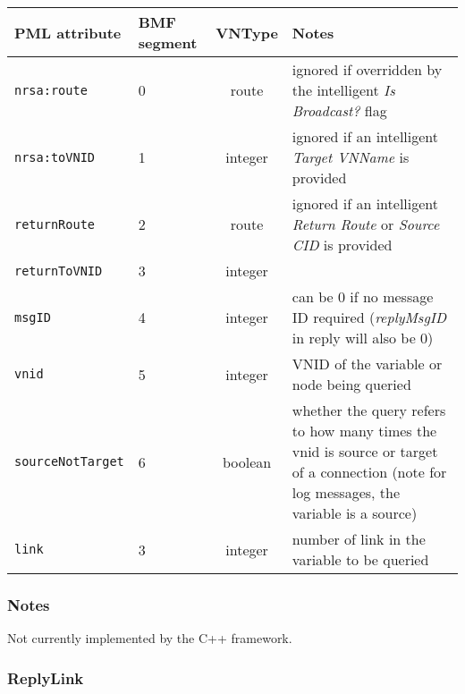 \documentclass[pdftex,a4paper]{article}
\newcommand{\XMLfont}[1]{{\tt \small #1}}
\begin{document}
\begin{table}[!h]
  \begin{center}
    \label{tab:QueryLink}
    \begin{tabular}{|l|p{13mm}|c|p{60mm}|}
      \hline

      \textbf{PML attribute} & \textbf{BMF segment} & \textbf{VNType}
      & \textbf{Notes} \\\hline

      \XMLfont{nrsa:route} & 0 & route & ignored if overridden by the
      intelligent {\em Is Broadcast?} flag \\\hline

      \XMLfont{nrsa:toVNID} & 1 & integer & ignored if an intelligent {\em
      Target VNName} is provided \\\hline

      \XMLfont{returnRoute} & 2 & route & ignored if an
      intelligent {\em Return Route} or {\em Source CID} is provided
      \\\hline

      \XMLfont{returnToVNID} & 3 & integer & \\\hline

      \XMLfont{msgID} & 4 & integer & can be 0 if no message ID
      required ({\em replyMsgID} in reply will also be 0) \\\hline

      \XMLfont{vnid} & 5 & integer & VNID of the variable or
      node being queried \\\hline

      \XMLfont{sourceNotTarget} & 6 & boolean & whether the query
      refers to how many times the vnid is source or target of a
      connection (note for log messages, the variable is a
      source)\\\hline

      \XMLfont{link} & 3 & integer & number of link in the
      variable to be queried \\\hline

    \end{tabular}
  \end{center}
\end{table}

\subsubsection*{Notes}
Not currently implemented by the C++ framework.

\subsubsection{ReplyLink}
\end{document}
